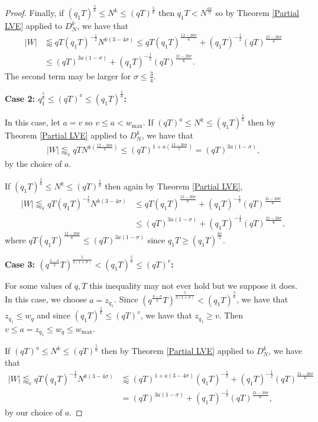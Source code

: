 \documentclass[12pt]{amsart}
\theoremstyle{definition}
\theoremstyle{plain}
\theoremstyle{remark}
\numberwithin{equation}{section}
\numberwithin{theorem}{section}
\numberwithin{equation}{section}
\begin{document}
\begin{proof}
		Finally, if $(q_1T)^{\frac{5}{6}} \leq N^k \leq (qT)^{\frac{5}{6}}$ then $q_1 T < N^{\frac{6k}{5}}$ so by Theorem \ref{Partial LVE} applied to $D_N^k$, we have that
		\begin{align*}
			|W| &\lessapprox qT (q_1T)^{-\frac{1}{2}}N^{k(3-4\sigma)} \leq qT(q_1T)^{\frac{12-20\sigma}{6}}+(q_1T)^{-\frac{1}{2}}(qT)^{\frac{21-20\sigma}{6}} \\
			&\leq (qT)^{3a(1-\sigma)}+(q_1T)^{-\frac{1}{2}}(qT)^{\frac{21-20\sigma}{6}}.
		\end{align*}
		The second term may be larger for $\sigma \leq \frac{3}{4}$.
		
		\noindent \textbf{Case 2: $q_1^{\frac{5}{6}} \leq (qT)^v \leq (q_1T)^{\frac{5}{6}}$:}
		
		In this case, let $a=v$ so $v \leq a < w_{\text{max}}$. If $(qT)^a \leq N^k \leq (q_1T)^{\frac{5}{6}}$ then by Theorem \ref{Partial LVE} applied to $D_N^k$, we have that 
		\begin{align*}
			|W| \lessapprox_{\epsilon} qTN^{k(\frac{12-20\sigma}{5})} \leq (qT)^{1+a(\frac{12-20\sigma}{5})}  = (qT)^{3a(1-\sigma)},
		\end{align*}
		by the choice of $a$.
		
		If $(q_1T)^{\frac{5}{6}} \leq N^k \leq (qT)^{\frac{5}{6}}$ then again by Theorem \ref{Partial LVE},
		\begin{align*}
			|W| \lessapprox_{\epsilon} qT (q_1T)^{-\frac{1}{2}}N^{k(3-4\sigma)} &\leq qT(q_1T)^{\frac{12-20\sigma}{6}}+(q_1T)^{-\frac{1}{2}}(qT)^{\frac{21-20\sigma}{6}} \\
			&\leq (qT)^{3a(1-\sigma)} +(q_1T)^{-\frac{1}{2}}(qT)^{\frac{21-20\sigma}{6}},
		\end{align*}
		where $qT(q_1T)^{\frac{12-20\sigma}{6}} \leq (qT)^{3a(1-\sigma)}$ since $q_1T \geq (q_1T)^{\frac{6v}{5}}$. 
		
		\noindent \textbf{Case 3: $(q^{\frac{3-\sigma}{3}}T)^{\frac{5}{3(1+\sigma)}}<(q_1T)^{\frac{5}{6}} \leq (qT)^v$:}
		
		For some values of $q,T$ this inequality may not ever hold but we suppose it does. In this case, we choose $a=z_{q_1}$. Since $(q^{\frac{3-\sigma}{3}}T)^{\frac{5}{3(1+\sigma)}} < (q_1T)^{\frac{5}{6}}$, we have that $z_{q_1} \leq w_q$ and since $(q_1T)^{\frac{5}{6}} \leq (qT)^v$, we have that $z_{q_1} \geq v$. Then $ v \leq a = z_{q_1} \leq w_{q} \leq w_{\text{max}}$.
		
		If $(qT)^a \leq N^k \leq (qT)^{\frac{5}{6}}$ then by Theorem \ref{Partial LVE} applied to $D_N^k$, we have that 
		\begin{align*}
			|W| \lessapprox_{\epsilon} qT(q_1T)^{-\frac{1}{2}}N^{k(3-4\sigma)} &\lessapprox (qT)^{1+a(3-4\sigma)}(q_1T)^{-\frac{1}{2}} + (q_1T)^{-\frac{1}{2}}(qT)^{\frac{21-20\sigma}{6}} \\
			&=(qT)^{3a(1-\sigma)}+(q_1T)^{-\frac{1}{2}}(qT)^{\frac{21-20\sigma}{6}},
		\end{align*}
		by our choice of $a$. 
		

\end{proof}
\end{document}
